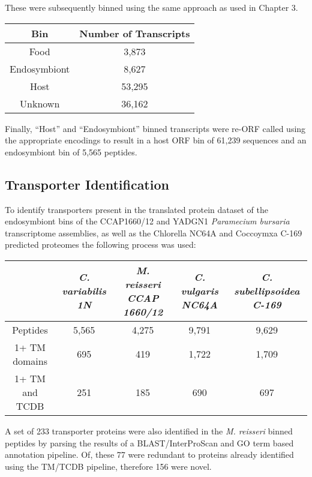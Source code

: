 These were subsequently binned using the same approach as used in 
Chapter 3. 

\begin{table}
    \begin{tabular}{|c|c|}
        \hline
        \textbf{Bin} & \textbf{Number of Transcripts} \\
        \hline
        Food & 3,873 \\
        Endosymbiont & 8,627 \\
        Host & 53,295 \\
        Unknown & 36,162 \\
        \hline
    \end{tabular}
\end{table}

Finally, ``Host'' and ``Endosymbiont'' binned transcripts 
were re-ORF called using the appropriate encodings to result in a 
host ORF bin of 61,239 sequences
and an endosymbiont bin of 5,565 peptides. 

\subsection{Transporter Identification}

To identify transporters present in the translated protein dataset of the 
endosymbiont bins of the CCAP1660/12 and YADGN1 
\textit{Paramecium bursaria} transcriptome assemblies, as well as the Chlorella NC64A 
and Coccoymxa C-169 predicted proteomes the following process was used:

\begin{table}
    \begin{tabular}{|c|c|c|c|c|}
        \hline
        & \textit{C. variabilis 1N} & \textit{M. reisseri CCAP 1660/12} & \textit{C. vulgaris NC64A} & \textit{C. subellipsoidea C-169} \\
        \hline
        Peptides        & 5,565 & 4,275 & 9,791 & 9,629 \\
        1+ TM domains   & 695 & 419 & 1,722 & 1,709 \\
        1+ TM and TCDB  & 251 & 185 & 690 & 697 \\
        \hline
    \end{tabular}
\end{table}






A set of 233 
transporter proteins were also identified 
in the \textit{M. reisseri} binned peptides
by parsing the results of a 
BLAST/InterProScan and GO term based annotation pipeline.
Of, these 77 were redundant to proteins already identified using
the TM/TCDB pipeline, therefore 156 were novel.

